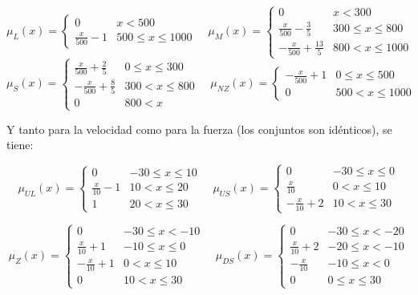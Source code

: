 \documentclass[
]{article}
\begin{document}
\[\mu_{L}\left(x\right)=\begin{cases}
0 & x<500\\
\frac{x}{500}-1 & 500\leq x\leq1000
\end{cases} \quad \mu_{M}\left(x\right)=\begin{cases}
0 & x<300\\
\frac{x}{500}-\frac{3}{5} & 300\leq x\leq800\\
-\frac{x}{500}+\frac{13}{5} & 800<x\leq1000
\end{cases} \] \[\mu_{S}\left(x\right)=\begin{cases}
\frac{x}{500}+\frac{2}{5} & 0\leq x\leq300\\
-\frac{x}{500}+\frac{8}{5} & 300<x\leq800\\
0 & 800<x
\end{cases} \quad \mu_{NZ}\left(x\right)=\begin{cases}
-\frac{x}{500}+1 & 0\leq x\leq500\\
0 & 500<x\leq1000
\end{cases}\]

Y tanto para la velocidad como para la fuerza (los conjuntos son
idénticos), se tiene:

\[\mu_{UL}\left(x\right)=\begin{cases}
0 & -30\leq x\leq10\\
\frac{x}{10}-1 & 10<x\leq20\\
1 & 20<x\leq30
\end{cases} \quad \mu_{US}\left(x\right)=\begin{cases}
0 & -30\leq x\leq0\\
\frac{x}{10} & 0<x\leq10\\
-\frac{x}{10}+2 & 10<x\leq30
\end{cases}\]

\[\mu_{Z}\left(x\right)=\begin{cases}
0 & -30\leq x<-10\\
\frac{x}{10}+1 & -10\leq x\leq0\\
-\frac{x}{10}+1 & 0<x\leq10\\
0 & 10<x\leq30
\end{cases} \quad \mu_{DS}\left(x\right)=\begin{cases}
0 & -30\leq x<-20\\
\frac{x}{10}+2 & -20\leq x<-10\\
-\frac{x}{10} & -10\leq x<0\\
0 & 0\leq x\leq30
\end{cases}\]
\end{document}
